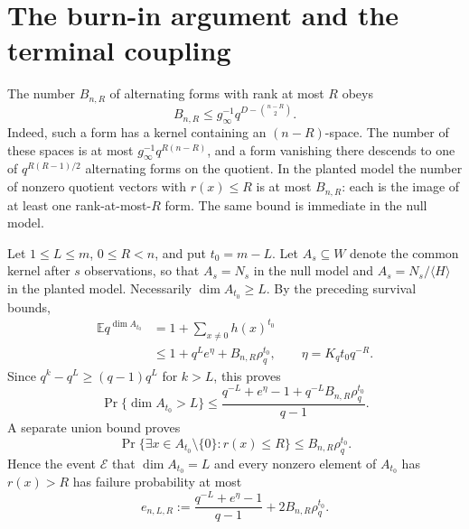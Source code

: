 \section{The burn-in argument and the terminal coupling}

The number $B_{n,R}$ of alternating forms with rank at most $R$ obeys
\begin{equation}\label{crit:rankcount}
 B_{n,R}\le g_\infty^{-1}q^{D-\binom{n-R}{2}}.
\end{equation}
Indeed, such a form has a kernel containing an $(n-R)$-space. The
number of these spaces is at most
$g_\infty^{-1}q^{R(n-R)}$, and a form vanishing there descends to
one of $q^{R(R-1)/2}$ alternating forms on the quotient.
In the planted model the number of nonzero quotient vectors with
$r(x)\le R$ is at most $B_{n,R}$: each is the image of at least one
rank-at-most-$R$ form. The same bound is immediate in the null model.

Let $1\le L\le m$, $0\le R<n$, and put $t_0=m-L$. Let
$A_s\subseteq W$ denote the common kernel after $s$ observations, so
that $A_s=N_s$ in the null model and $A_s=N_s/\langle H\rangle$ in
the planted model. Necessarily $\dim A_{t_0}\ge L$. By the preceding
survival bounds,
\begin{align}
 \mathbb E q^{\dim A_{t_0}}
 &=1+\sum_{x\ne0}h(x)^{t_0}\nonumber\\
 &\le1+q^L e^{\eta}+B_{n,R}\rho_q^{t_0},\qquad
 \eta=K_qt_0q^{-R}.\label{crit:firstmoment}
\end{align}
Since $q^k-q^L\ge(q-1)q^L$ for $k>L$, this proves
\begin{equation}\label{crit:burnRank}
 \Pr\{\dim A_{t_0}>L\}
 \le\frac{q^{-L}+e^\eta-1+q^{-L}B_{n,R}\rho_q^{t_0}}{q-1}.
\end{equation}
A separate union bound proves
\[
 \Pr\{\exists x\in A_{t_0}\setminus\{0\}:r(x)\le R\}
 \le B_{n,R}\rho_q^{t_0}.
\]
Hence the event $\mathcal E$ that $\dim A_{t_0}=L$ and every nonzero
element of $A_{t_0}$ has $r(x)>R$ has failure probability at most
\begin{equation}\label{crit:burnError}
 e_{n,L,R}:=
 \frac{q^{-L}+e^\eta-1}{q-1}+2B_{n,R}\rho_q^{t_0}.
\end{equation}

